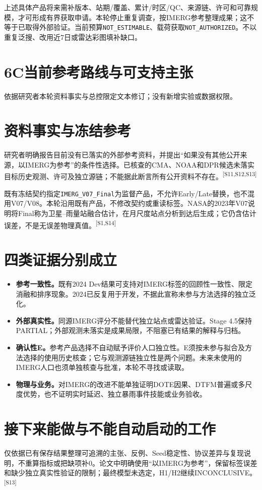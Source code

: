 \documentclass[UTF8,10.5pt,a4paper,fontset=none]{ctexart}
\newcommand{\evi}[1]{\textsuperscript{\color{muted}[#1]}}
\newcommand{\pageheading}[2]{\clearpage\section*{#1}\textcolor{muted}{#2}\par\vspace{3pt}}
\begin{document}
上述具体产品将来需补版本、站期/覆盖、累计/时区/QC、来源链、许可和可靠规模，才可形成有界获取申请。本轮停止重复调查，按IMERG参考整理成果；这不等于已取得外部验证。当前预算\texttt{NOT\_ESTIMABLE}、载荷获取\texttt{NOT\_AUTHORIZED}。不以重复泛搜、改用近7日或雷达彩图填补缺口。

\pageheading{6C\quad 当前参考路线与可支持主张}{依据研究者本轮资料事实与总控限定文本修订；没有新增实验或数据权限。}
\section*{资料事实与冻结参考}
研究者明确报告目前没有已落实的外部参考资料，并提出“如果没有其他公开来源，以IMERG为参考”的条件性选择。已核查的CMA、NOAA和DPR候选未落实目标历史观测、许可及独立源链；不能据此断言所有公开资料不存在。\evi{S11,S12,S13}

既有冻结契约指定\texttt{IMERG\_V07\_Final}为监督产品，不允许Early/Late替换，也不混用V07/V08。本轮沿用既有产品，不修改契约或重读标签。NASA的2023年V07说明将Final称为卫星--雨量站融合估计，在月尺度站点分析到达后生成；它仍含估计误差，不是无误差物理真值。\evi{S1,S14}

\section*{四类证据分别成立}
\begin{itemize}
\item \textbf{参考一致性。}既有2024 Dev结果可支持对IMERG标签的回顾性一致性、限定消融和排序现象。2024已反复用于开发，不据此宣称未参与方法选择的独立泛化。
\item \textbf{外部真实性。}同源IMERG评分不能替代独立站点或雷达验证。Stage 4.5保持PARTIAL；外部观测未落实是成果局限，不阻塞已有结果的解释与归档。
\item \textbf{确认性E。}参考产品选择不自动赋予评价人口独立性。E须按未参与拟合及方法选择的使用历史核查；它与观测源链独立性是两个问题。未来未使用的IMERG人口也须单独核查与批准，本轮不寻找或读取。
\item \textbf{物理与业务。}对IMERG的改进不能单独证明DOTE因果、DTFM普遍或多尺度优势，也不证明实时延迟、独立暴雨事件技能或业务验收。
\end{itemize}

\section*{接下来能做与不能自动启动的工作}
仅依据已有保存结果整理可追溯的主张、反例、Seed稳定性、协议差异与复现说明，不重算指标或把缺项补0。论文中明确使用“以IMERG为参考”，保留标签误差和缺少独立真实性验证的限制；最终模型未选定，H1/H2继续INCONCLUSIVE。\evi{S13}
\end{document}
